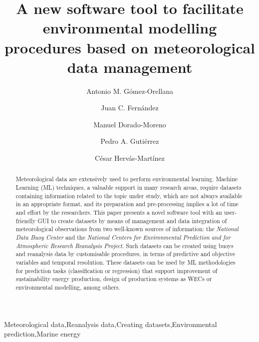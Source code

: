\documentclass[review]{elsarticle}
\begin{document}
	\begin{frontmatter}
	
		
		\title{A new software tool to facilitate environmental modelling procedures based on meteorological data management}
		
		\author[UCO]{Antonio M. G\'omez-Orellana}
		
		\author[UCO]{Juan C. Fern\'andez}
		
		\author[UCO]{Manuel Dorado-Moreno}
		
		\author[UCO]{Pedro A. Guti\'errez}
		
		\author[UCO]{C\'esar Herv\'as-Mart\'inez}
		
		\address[UCO]{Department of Computer Science and Numerical Analysis, University of Cordoba, 14071, C\'ordoba, Spain.}
		
		\begin{abstract}
			Meteorological data are extensively used to perform environmental learning. Machine Learning (ML) techniques, a valuable support in many research areas, require datasets containing information related to the topic under study, which are not always available in an appropriate format, and its preparation and pre-processing implies a lot of time and effort by the researchers. This paper presents a novel software tool with an user-friendly GUI to create datasets by means of management and data integration of meteorological observations from two well-known sources of information: the \textit{National Data Buoy Center} and the \textit{National Centers for Environmental Prediction and for Atmospheric Research Reanalysis Project}. Such datasets can be created using buoys and reanalysis data by customisable procedures, in terms of predictive and objective variables and temporal resolution. These datasets can be used by ML methodologies for prediction tasks (classification or regression) that support improvement of sustainability energy production, design of production systems as WECs or environmental modelling, among others.
		\end{abstract}

		
		\begin{keyword}
			Meteorological data\sep Reanalysis data\sep Creating datasets\sep Environmental prediction\sep Marine energy
		\end{keyword}


	\end{frontmatter}
\end{document}
